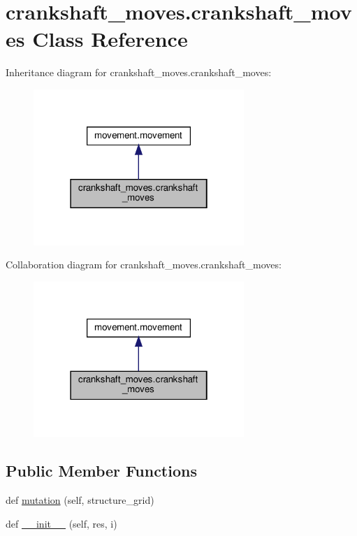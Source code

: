\hypertarget{classcrankshaft__moves_1_1crankshaft__moves}{}\section{crankshaft\+\_\+moves.\+crankshaft\+\_\+moves Class Reference}
\label{classcrankshaft__moves_1_1crankshaft__moves}


Inheritance diagram for crankshaft\+\_\+moves.\+crankshaft\+\_\+moves\+:
\nopagebreak
\begin{figure}[H]
\begin{center}
\leavevmode
\includegraphics[width=226pt]{classcrankshaft__moves_1_1crankshaft__moves__inherit__graph}
\end{center}
\end{figure}


Collaboration diagram for crankshaft\+\_\+moves.\+crankshaft\+\_\+moves\+:
\nopagebreak
\begin{figure}[H]
\begin{center}
\leavevmode
\includegraphics[width=226pt]{classcrankshaft__moves_1_1crankshaft__moves__coll__graph}
\end{center}
\end{figure}
\subsection*{Public Member Functions}
\begin{DoxyCompactItemize}
\item 
def \hyperlink{classcrankshaft__moves_1_1crankshaft__moves_a3f03860d511fcb97e6dd85f851a37c63}{mutation} (self, structure\+\_\+grid)
\item 
def \hyperlink{classcrankshaft__moves_1_1crankshaft__moves_a3d64490ab0dc61e8909c11c65555f512}{\+\_\+\+\_\+init\+\_\+\+\_\+} (self, res, i)
\end{DoxyCompactItemize}
